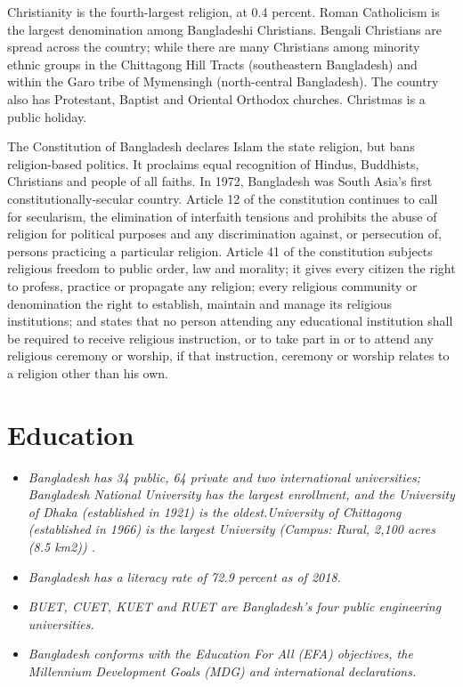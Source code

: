 Christianity is the fourth-largest religion, at 0.4 percent. Roman
Catholicism is the largest denomination among Bangladeshi Christians.
Bengali Christians are spread across the country; while there are many
Christians among minority ethnic groups in the Chittagong Hill Tracts
(southeastern Bangladesh) and within the Garo tribe of Mymensingh
(north-central Bangladesh). The country also has Protestant, Baptist and
Oriental Orthodox churches. Christmas is a public holiday.

The Constitution of Bangladesh declares Islam the state religion, but
bans religion-based politics. It proclaims equal recognition of Hindus,
Buddhists, Christians and people of all faiths. In 1972, Bangladesh was
South Asia's first constitutionally-secular country. Article 12 of the
constitution continues to call for secularism, the elimination of
interfaith tensions and prohibits the abuse of religion for political
purposes and any discrimination against, or persecution of, persons
practicing a particular religion. Article 41 of the constitution
subjects religious freedom to public order, law and morality; it gives
every citizen the right to profess, practice or propagate any religion;
every religious community or denomination the right to establish,
maintain and manage its religious institutions; and states that no
person attending any educational institution shall be required to
receive religious instruction, or to take part in or to attend any
religious ceremony or worship, if that instruction, ceremony or worship
relates to a religion other than his own.

\section{Education}\label{education}

\begin{itemize}
\item
  \emph{Bangladesh has 34 public, 64 private and two international
  universities; Bangladesh National University has the largest
  enrollment, and the University of Dhaka (established in 1921) is the
  oldest.University of Chittagong (established in 1966) is the largest
  University (Campus: Rural, 2,100 acres (8.5 km2)) .}
\item
  \emph{Bangladesh has a literacy rate of 72.9 percent as of 2018.}
\item
  \emph{BUET, CUET, KUET and RUET are Bangladesh's four public
  engineering universities.}
\item
  \emph{Bangladesh conforms with the Education For All (EFA) objectives,
  the Millennium Development Goals (MDG) and international
  declarations.}
\end{itemize}

